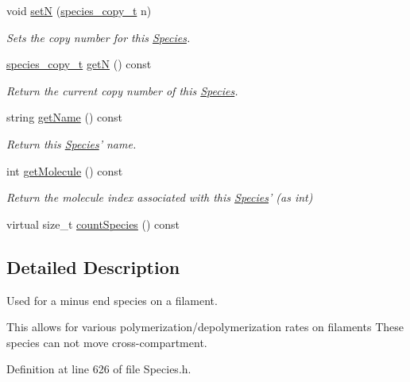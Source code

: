 \begin{DoxyCompactItemize}
void \hyperlink{classSpecies_a88de7cf5130cb9cee2da3585374db654}{set\+N} (\hyperlink{common_8h_a3503f321fd36304ee274141275cca586}{species\+\_\+copy\+\_\+t} n)
\begin{DoxyCompactList}\small\item\em Sets the copy number for this \hyperlink{classSpecies}{Species}. \end{DoxyCompactList}\item 
\hyperlink{common_8h_a3503f321fd36304ee274141275cca586}{species\+\_\+copy\+\_\+t} \hyperlink{classSpecies_aea7327b3fed261c705b4d32b9973aa58}{get\+N} () const 
\begin{DoxyCompactList}\small\item\em Return the current copy number of this \hyperlink{classSpecies}{Species}. \end{DoxyCompactList}\item 
string \hyperlink{classSpecies_a28fa239dded841133760ff9c47af63a1}{get\+Name} () const 
\begin{DoxyCompactList}\small\item\em Return this \hyperlink{classSpecies}{Species}' name. \end{DoxyCompactList}\item 
int \hyperlink{classSpecies_a1ea8969c51bc69879891a408f9e197c7}{get\+Molecule} () const 
\begin{DoxyCompactList}\small\item\em Return the molecule index associated with this \hyperlink{classSpecies}{Species}' (as int) \end{DoxyCompactList}\item 
virtual size\+\_\+t \hyperlink{classSpecies_a1864e111fe0304ca8d6b2d0d955a7356}{count\+Species} () const 
\end{DoxyCompactItemize}


\subsection{Detailed Description}
Used for a minus end species on a filament. 

This allows for various polymerization/depolymerization rates on filaments These species can not move cross-\/compartment. 

Definition at line 626 of file Species.\+h.



